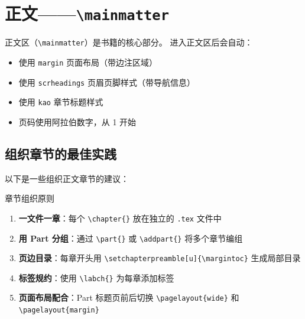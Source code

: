 
\section{正文——\texttt{\textbackslash mainmatter}}


正文区（\texttt{\textbackslash mainmatter}）是书籍的核心部分。
进入正文区后会自动：
\begin{itemize}
    \item 使用 \texttt{margin} 页面布局（带边注区域）
    \item 使用 \texttt{scrheadings} 页眉页脚样式（带导航信息）
    \item 使用 \texttt{kao} 章节标题样式
    \item 页码使用阿拉伯数字，从 1 开始
\end{itemize}

\subsection{组织章节的最佳实践}

以下是一些组织正文章节的建议：

\begin{sidebox}{章节组织原则}
\begin{enumerate}
    \item \textbf{一文件一章}：每个 \lstinline|\chapter{}| 放在独立的 %
\texttt{.tex} 文件中
    \item \textbf{用 Part 分组}：通过 \lstinline|\part{}| 或
\texttt{\textbackslash addpart\{\}} 将多个章节编组
    \item \textbf{页边目录}：每章开头用 \lstinline|\setchapterpreamble[u]{\margintoc}| 生成局部目录
    \item \textbf{标签规约}：使用 \lstinline|\labch{}| 为每章添加标签
    \item \textbf{页面布局配合}：Part 标题页前后切换 \lstinline|\pagelayout{wide}| %
和 \lstinline|\pagelayout{margin}|
\end{enumerate}
\end{sidebox}

